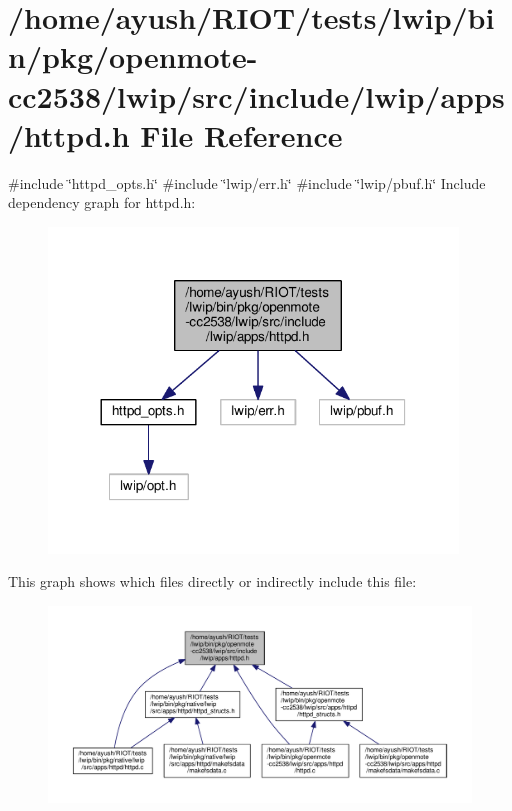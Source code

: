 \hypertarget{openmote-cc2538_2lwip_2src_2include_2lwip_2apps_2httpd_8h}{}\section{/home/ayush/\+R\+I\+O\+T/tests/lwip/bin/pkg/openmote-\/cc2538/lwip/src/include/lwip/apps/httpd.h File Reference}
\label{openmote-cc2538_2lwip_2src_2include_2lwip_2apps_2httpd_8h}
{\ttfamily \#include \char`\"{}httpd\+\_\+opts.\+h\char`\"{}}\newline
{\ttfamily \#include \char`\"{}lwip/err.\+h\char`\"{}}\newline
{\ttfamily \#include \char`\"{}lwip/pbuf.\+h\char`\"{}}\newline
Include dependency graph for httpd.\+h\+:
\nopagebreak
\begin{figure}[H]
\begin{center}
\leavevmode
\includegraphics[width=308pt]{openmote-cc2538_2lwip_2src_2include_2lwip_2apps_2httpd_8h__incl}
\end{center}
\end{figure}
This graph shows which files directly or indirectly include this file\+:
\nopagebreak
\begin{figure}[H]
\begin{center}
\leavevmode
\includegraphics[width=350pt]{openmote-cc2538_2lwip_2src_2include_2lwip_2apps_2httpd_8h__dep__incl}
\end{center}
\end{figure}
